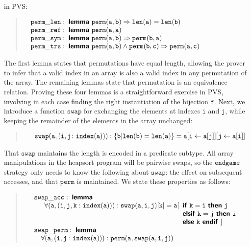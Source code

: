 \documentclass[english,submission]{eptcs}
\begin{document}
in PVS:
\begin{quote}
\noindent $\quad\begin{array}[t]{@{}l}
\mathtt{perm\_len:\;\textsf{\textbf{lemma}}\ perm(a,b)\Rightarrow len(a)=len(b)}\\
\mathtt{perm\_ref:\;\textsf{\textbf{lemma}}\ perm(a,a)}\\
\mathtt{perm\_sym:\;\textsf{\textbf{lemma}}\ perm(a,b)\Rightarrow perm(b,a)}\\
\mathtt{perm\_trs:\;\textsf{\textbf{lemma}}\ \mathtt{perm(a,b)\land perm(b,c)\Rightarrow perm(a,c)}}
\end{array}$
\end{quote}
\noindent The first lemma states that permutations have equal length,
allowing the prover to infer that a valid index in an array is also
a valid index in any permutation of the array. The remaining lemmas
state that permutation is an equivalence relation. Proving these four
lemmas is a straightforward exercise in PVS, involving in each case
finding the right instantiation of the bijection $\mathtt{f}$. Next,
we introduce a function $\mathtt{swap}$ for exchanging the elements
at indexes $\mathtt{i}$ and $\mathtt{j}$, while keeping the remainder
of the elements in the array unchanged:
\begin{quote}
$\quad\begin{array}[t]{l}
\mathtt{swap(a,(i,j\colon index(a))):\{b|len(b)=len(a)\}=a[i\leftarrow a[j]][j\leftarrow a[i]]}\end{array}$
\end{quote}
\noindent That $\mathtt{swap}$ maintains the length is encoded in
a predicate subtype. All array manipulations in the heapsort program
will be pairwise swaps, so the $\texttt{endgame}$ strategy only needs
to know the following about $\mathtt{swap}$: the effect on subsequent
accesses, and that $\mathtt{perm}$ is maintained. We state these
properties as follows:
\begin{quote}
\noindent $\quad\begin{array}[t]{l}
\mathtt{swap\_acc:\;\textsf{\textbf{lemma}}}\\
\begin{array}[t]{l}
\quad\mathtt{\forall(a,(i,j,k:index(a))):swap(a,i,j)[k]=a[}\begin{array}[t]{l}
\mathtt{\textsf{\textbf{if}}\ k=i\ \textsf{\textbf{then}}\ j}\\
\mathtt{\textsf{\textbf{elsif}}\ k=j\ \textsf{\textbf{then}}\ i}\\
\mathtt{\textsf{\textbf{else}}\ k\ \textsf{\textbf{endif}}\ ]}
\end{array}\end{array}\\
\mathtt{swap\_perm:\;\textsf{\textbf{lemma}}}\\
\mathtt{\quad\forall(a,(i,j:index(a))):perm(a,swap(a,i,j))}
\end{array}$
\end{quote}
\end{document}
